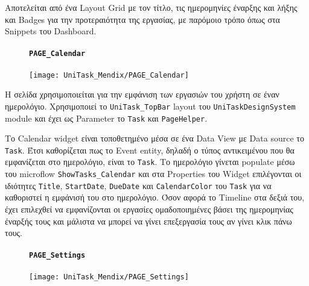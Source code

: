                 Αποτελείται από ένα Layout Grid με τον τίτλο, τις ημερομηνίες έναρξης και λήξης και Badges για την προτεραιότητα της εργασίας, με παρόμοιο τρόπο όπως στα Snippets του Dashboard.

                \begin{figure}[H] \noindent
                    \paragraph{\texttt{PAGE\_Calendar}}
                    \begin{center}
                        \texttt{[image: UniTask\_Mendix/PAGE\_Calendar]}
                    \end{center}
                \end{figure}

                Η σελίδα χρησιμοποιείται για την εμφάνιση των εργασιών του χρήστη σε έναν ημερολόγιο. Χρησιμοποιεί το \texttt{UniTask\_TopBar} layout του \texttt{UniTaskDesignSystem} module και έχει ως Parameter το \texttt{Task} και \texttt{PageHelper}.

                Το Calendar widget είναι τοποθετημένο μέσα σε ένα Data View με Data source το \texttt{Task}. Έτσι καθορίζεται πως το Event entity, δηλαδή ο τύπος αντικειμένου που θα εμφανίζεται στο ημερολόγιο, είναι το \texttt{Task}. Το ημερολόγιο γίνεται populate μέσω του microflow \texttt{ShowTasks\_Calendar} και στα Properties του Widget επιλέγονται οι ιδιότητες \texttt{Title}, \texttt{StartDate}, \texttt{DueDate} και \texttt{CalendarColor} του \texttt{Task} για να καθοριστεί η εμφάνισή του στο ημερολόγιο. Όσον αφορά το Timeline στα δεξιά του, έχει επιλεχθεί να εμφανίζονται οι εργασίες ομαδοποιημένες βάσει της ημερομηνίας έναρξής τους και μάλιστα να μπορεί να γίνει επεξεργασία τους αν γίνει κλικ πάνω τους.

                \newpage

                \begin{figure}[H] \noindent
                    \paragraph{\texttt{PAGE\_Settings}}
                    \begin{center}
                        \texttt{[image: UniTask\_Mendix/PAGE\_Settings]}
                    \end{center}
                \end{figure}

